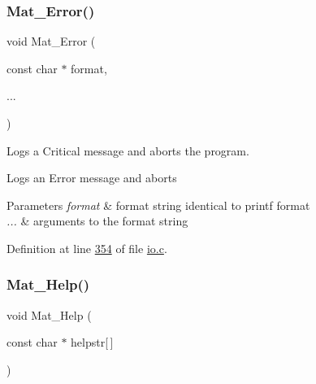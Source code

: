 \mbox{\label{group__mat__util_ga058b1cb9a4ca36712857d2b3c4de7ffc}} 
\subsubsection{\texorpdfstring{Mat\+\_\+\+Error()}{Mat\_Error()}}
{\footnotesize\ttfamily void Mat\+\_\+\+Error (\begin{DoxyParamCaption}\item[{const char $\ast$}]{format,  }\item[{}]{... }\end{DoxyParamCaption})}



Logs a Critical message and aborts the program. 

Logs an Error message and aborts


\begin{DoxyParams}{Parameters}
{\em format} & format string identical to printf format \\
\hline
{\em ...} & arguments to the format string \\
\hline
\end{DoxyParams}


Definition at line \hyperlink{io_8c_source_l00354}{354} of file \hyperlink{io_8c_source}{io.\+c}.

\mbox{\label{group__mat__util_gaa4039c185e807ed2e9682b66fe2ea331}} 
\subsubsection{\texorpdfstring{Mat\+\_\+\+Help()}{Mat\_Help()}}
{\footnotesize\ttfamily void Mat\+\_\+\+Help (\begin{DoxyParamCaption}\item[{const char $\ast$}]{helpstr\mbox{[}$\,$\mbox{]} }\end{DoxyParamCaption})}



